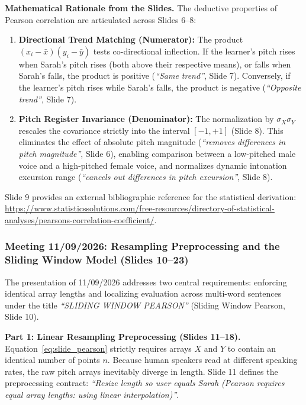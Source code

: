 \documentclass[11pt,a4paper]{article}
\begin{document}
\textbf{Mathematical Rationale from the Slides.} The deductive properties of Pearson correlation are articulated across Slides 6--8:
\begin{enumerate}
    \item \textbf{Directional Trend Matching (Numerator):} The product $(x_i - \bar{x})(y_i - \bar{y})$ tests co-directional inflection. If the learner's pitch rises when Sarah's pitch rises (both above their respective means), or falls when Sarah's falls, the product is positive (\textit{``Same trend''}, Slide 7). Conversely, if the learner's pitch rises while Sarah's falls, the product is negative (\textit{``Opposite trend''}, Slide 7).
    \item \textbf{Pitch Register Invariance (Denominator):} The normalization by $\sigma_X \sigma_Y$ rescales the covariance strictly into the interval $[-1, +1]$ (Slide 8). This eliminates the effect of absolute pitch magnitude (\textit{``removes differences in pitch magnitude''}, Slide 6), enabling comparison between a low-pitched male voice and a high-pitched female voice, and normalizes dynamic intonation excursion range (\textit{``cancels out differences in pitch excursion''}, Slide 8).
\end{enumerate}
Slide 9 provides an external bibliographic reference for the statistical derivation: \url{https://www.statisticssolutions.com/free-resources/directory-of-statistical-analyses/pearsons-correlation-coefficient/}.

\subsubsection*{Meeting 11/09/2026: Resampling Preprocessing and the Sliding Window Model (Slides 10--23)}

The presentation of 11/09/2026 addresses two central requirements: enforcing identical array lengths and localizing evaluation across multi-word sentences under the title \textit{``SLIDING WINDOW PEARSON''} (Sliding Window Pearson, Slide 10).

\textbf{Part 1: Linear Resampling Preprocessing (Slides 11--18).} Equation~\eqref{eq:slide_pearson} strictly requires arrays $X$ and $Y$ to contain an identical number of points $n$. Because human speakers read at different speaking rates, the raw pitch arrays inevitably diverge in length. Slide 11 defines the preprocessing contract: \textit{``Resize length so user equals Sarah (Pearson requires equal array lengths: using linear interpolation)''}.
\end{document}
